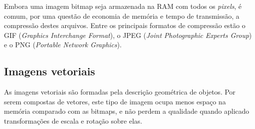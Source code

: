 Embora uma imagem bitmap seja armazenada na RAM com todos os \textit{pixels}, é
comum, por uma questão de economia de memória e tempo de transmissão, a compressão
destes arquivos. Entre os principais formatos de compressão estão
o GIF (\textit{Graphics Interchange Format}), o JPEG
(\textit{Joint Photographic Experts Group}) e o PNG (\textit{Portable Network Graphics}).

\subsection{Imagens vetoriais}

As imagens vetoriais são formadas pela descrição geométrica de objetos.
Por serem compostas de vetores, este tipo de imagem ocupa menos espaço na
memória comparado com as bitmaps, e não perdem a qualidade quando
aplicado transformações de escala e rotação sobre elas.

